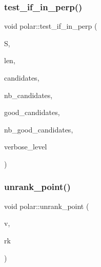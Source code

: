 \mbox{\label{classpolar_a6e400ec31bb2c7ab36b3b19da84139a8}} 
\subsubsection{\texorpdfstring{test\+\_\+if\+\_\+in\+\_\+perp()}{test\_if\_in\_perp()}}
{\footnotesize\ttfamily void polar\+::test\+\_\+if\+\_\+in\+\_\+perp (\begin{DoxyParamCaption}\item[{\mbox{\hyperlink{galois_8h_a09fddde158a3a20bd2dcadb609de11dc}{I\+NT}} $\ast$}]{S,  }\item[{\mbox{\hyperlink{galois_8h_a09fddde158a3a20bd2dcadb609de11dc}{I\+NT}}}]{len,  }\item[{\mbox{\hyperlink{galois_8h_a09fddde158a3a20bd2dcadb609de11dc}{I\+NT}} $\ast$}]{candidates,  }\item[{\mbox{\hyperlink{galois_8h_a09fddde158a3a20bd2dcadb609de11dc}{I\+NT}}}]{nb\+\_\+candidates,  }\item[{\mbox{\hyperlink{galois_8h_a09fddde158a3a20bd2dcadb609de11dc}{I\+NT}} $\ast$}]{good\+\_\+candidates,  }\item[{\mbox{\hyperlink{galois_8h_a09fddde158a3a20bd2dcadb609de11dc}{I\+NT}} \&}]{nb\+\_\+good\+\_\+candidates,  }\item[{\mbox{\hyperlink{galois_8h_a09fddde158a3a20bd2dcadb609de11dc}{I\+NT}}}]{verbose\+\_\+level }\end{DoxyParamCaption})}

\mbox{\label{classpolar_a6a356ccd3b33226fa934bac414bfebd2}} 
\subsubsection{\texorpdfstring{unrank\+\_\+point()}{unrank\_point()}}
{\footnotesize\ttfamily void polar\+::unrank\+\_\+point (\begin{DoxyParamCaption}\item[{\mbox{\hyperlink{galois_8h_a09fddde158a3a20bd2dcadb609de11dc}{I\+NT}} $\ast$}]{v,  }\item[{\mbox{\hyperlink{galois_8h_a09fddde158a3a20bd2dcadb609de11dc}{I\+NT}}}]{rk }\end{DoxyParamCaption})}



